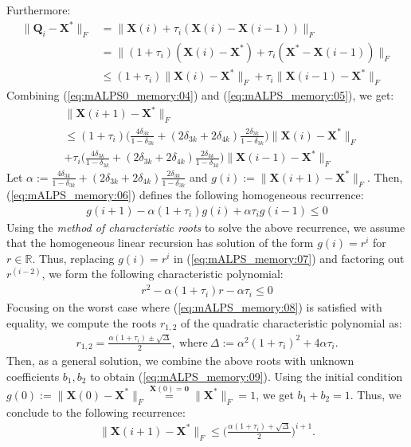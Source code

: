 \documentclass[twocolumn]{svjour3}
\newcommand{\vectornormbig}[1]{\big\|#1\big\|}
\newcommand{\signal}{\boldsymbol{X}}
\newcommand{\bestsignal}{\boldsymbol{X}^\ast}
\newcommand{\rank}{k}
\begin{document}
Furthermore:
\begin{align}
\vectornormbig{\boldsymbol{Q}_i - \bestsignal}_F &= \vectornormbig{\signal(i) + \tau_i(\signal(i) - \signal(i-1))}_F \nonumber \\ &= \vectornormbig{(1+\tau_i)(\signal(i) - \bestsignal) + \tau_i(\bestsignal - \signal(i-1))}_F \nonumber \\ &\leq (1+\tau_i)\vectornormbig{\signal(i) - \bestsignal}_F + \tau_i\vectornormbig{\signal(i-1) - \bestsignal}_F \label{eq:mALPS_memory:05}
\end{align} Combining (\ref{eq:mALPS0_memory:04}) and (\ref{eq:mALPS_memory:05}), we get:
\begin{align}
&\vectornormbig{\signal(i+1) - \bestsignal}_F \nonumber \\ &\leq (1+\tau_i)\Big(\frac{4\delta_{3\rank}}{1-\delta_{3\rank}} + (2\delta_{3\rank} + 2\delta_{4\rank})\frac{2\delta_{3\rank}}{1-\delta_{3\rank}}\Big) \vectornormbig{\signal(i) - \bestsignal}_F \nonumber \\ &+ \tau_i\Big(\frac{4\delta_{3\rank}}{1-\delta_{3\rank}} + (2\delta_{3\rank} + 2\delta_{4\rank})\frac{2\delta_{3\rank}}{1-\delta_{3\rank}}\Big) \vectornormbig{\signal(i-1) - \bestsignal}_F \label{eq:mALPS_memory:06}
\end{align} Let $ \alpha:= \frac{4\delta_{3\rank}}{1-\delta_{3\rank}} + (2\delta_{3\rank} + 2\delta_{4\rank})\frac{2\delta_{3\rank}}{1-\delta_{3\rank}} $ and $ g(i) := \vectornormbig{\signal(i+1) - \bestsignal}_F $. Then, (\ref{eq:mALPS_memory:06}) defines the following homogeneous recurrence:
\begin{align}
g(i+1) - \alpha(1+\tau_i)g(i) + \alpha \tau_i g(i-1) \leq 0 \label{eq:mALPS_memory:07}
\end{align} Using the {\it method of characteristic roots} to solve the above recurrence, we assume that the homogeneous linear recursion has solution of the form $ g(i) = r^i $ for $ r \in \mathbb{R} $. Thus, replacing $ g(i) = r^i $ in (\ref{eq:mALPS_memory:07}) and factoring out $ r^{(i-2)} $, we form the following characteristic polynomial:
\begin{align}
r^2 - \alpha (1 + \tau_i)r - \alpha \tau_i \leq 0 \label{eq:mALPS_memory:08}
\end{align} Focusing on the worst case where (\ref{eq:mALPS_memory:08}) is satisfied with equality, we compute the roots $ r_{1,2} $ of the quadratic characteristic polynomial as:
\begin{align}
r_{1,2} = \frac{\alpha (1+\tau_i) \pm \sqrt{\Delta}}{2}, ~\text{where}~ \Delta := \alpha^2(1+\tau_i)^2 + 4\alpha \tau_i. \nonumber
\end{align} Then, as a general solution, we combine the above roots with unknown coefficients $ b_1, b_2 $ to obtain (\ref{eq:mALPS_memory:09}).
Using the initial condition $ g(0) := \vectornormbig{\signal(0) - \bestsignal}_F \stackrel{\signal(0) = \mathbf{0}}{=} \vectornormbig{\bestsignal}_F = 1 $, we get $ b_1 + b_2 = 1 $. Thus, we conclude to the following recurrence:
\begin{align}
\vectornormbig{\signal(i+1) - \bestsignal}_F \leq \Big(\frac{\alpha (1+\tau_i) + \sqrt{\Delta}}{2} \Big)^{i+1}. \nonumber
\end{align}
\end{document}
